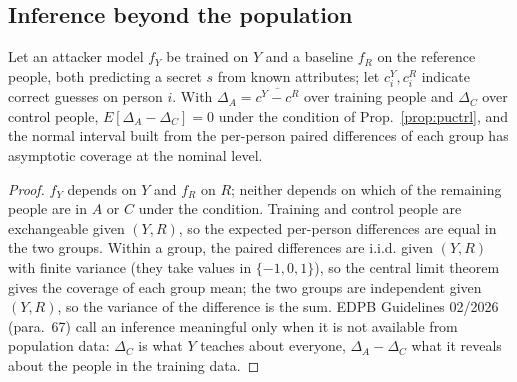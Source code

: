 \subsection{Inference beyond the population}
\setcounter{proposition}{605}
\begin{proposition}\label{prop:puattr}
Let an attacker model $f_Y$ be trained on $Y$ and a baseline $f_R$ on the reference people, both predicting a secret $s$ from known attributes; let $c^Y_i,c^R_i$ indicate correct guesses on person $i$. With $\Delta_A=\overline{c^Y-c^R}$ over training people and $\Delta_C$ over control people, $E[\Delta_A-\Delta_C]=0$ under the condition of Prop.~\ref{prop:puctrl}, and the normal interval built from the per-person paired differences of each group has asymptotic coverage at the nominal level.
\end{proposition}
\begin{proof}
$f_Y$ depends on $Y$ and $f_R$ on $R$; neither depends on which of the remaining people are in $A$ or $C$ under the condition. Training and control people are exchangeable given $(Y,R)$, so the expected per-person differences are equal in the two groups. Within a group, the paired differences are i.i.d. given $(Y,R)$ with finite variance (they take values in $\{-1,0,1\}$), so the central limit theorem gives the coverage of each group mean; the two groups are independent given $(Y,R)$, so the variance of the difference is the sum. EDPB Guidelines 02/2026 (para.~67) call an inference meaningful only when it is not available from population data: $\Delta_C$ is what $Y$ teaches about everyone, $\Delta_A-\Delta_C$ what it reveals about the people in the training data.
\end{proof}
\setcounter{proposition}{\value{savedprop}}
